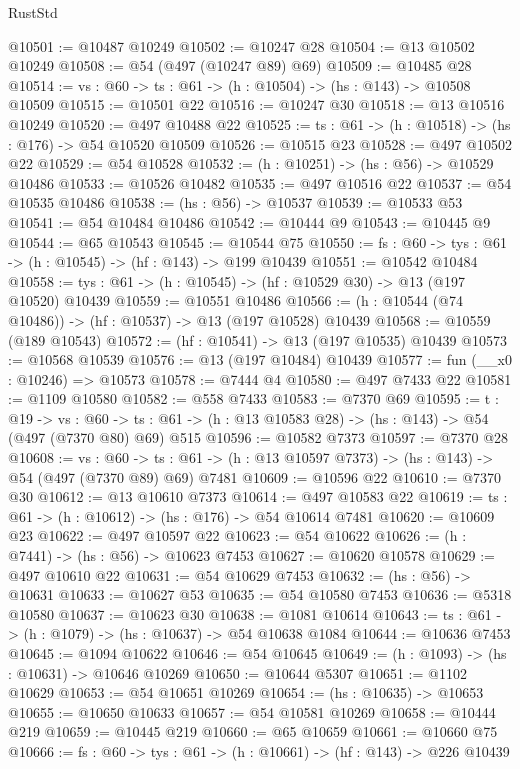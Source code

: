 \begin{lexlean}{RustStd}
\begin{coremodule}
@10501 := @10487 @10249
@10502 := @10247 @28
@10504 := @13 @10502 @10249
@10508 := @54 (@497 (@10247 @89) @69)
@10509 := @10485 @28
@10514 := {vs : @60} -> {ts : @61} -> (h : @10504) -> (hs : @143) -> @10508 @10509
@10515 := @10501 @22
@10516 := @10247 @30
@10518 := @13 @10516 @10249
@10520 := @497 @10488 @22
@10525 := {ts : @61} -> (h : @10518) -> (hs : @176) -> @54 @10520 @10509
@10526 := @10515 @23
@10528 := @497 @10502 @22
@10529 := @54 @10528
@10532 := (h : @10251) -> (hs : @56) -> @10529 @10486
@10533 := @10526 @10482
@10535 := @497 @10516 @22
@10537 := @54 @10535 @10486
@10538 := (hs : @56) -> @10537
@10539 := @10533 @53
@10541 := @54 @10484 @10486
@10542 := @10444 @9
@10543 := @10445 @9
@10544 := @65 @10543
@10545 := @10544 @75
@10550 := {fs : @60} -> {tys : @61} -> (h : @10545) -> (hf : @143) -> @199 @10439
@10551 := @10542 @10484
@10558 := {tys : @61} -> (h : @10545) -> (hf : @10529 @30) -> @13 (@197 @10520) @10439
@10559 := @10551 @10486
@10566 := (h : @10544 (@74 @10486)) -> (hf : @10537) -> @13 (@197 @10528) @10439
@10568 := @10559 (@189 @10543)
@10572 := (hf : @10541) -> @13 (@197 @10535) @10439
@10573 := @10568 @10539
@10576 := @13 (@197 @10484) @10439
@10577 := fun (__x0 : @10246) => @10573
@10578 := @7444 @4
@10580 := @497 @7433 @22
@10581 := @1109 @10580
@10582 := @558 @7433
@10583 := @7370 @69
@10595 := {t : @19} ->
  {vs : @60} -> {ts : @61} -> (h : @13 @10583 @28) -> (hs : @143) -> @54 (@497 (@7370 @80) @69) @515
@10596 := @10582 @7373
@10597 := @7370 @28
@10608 := {vs : @60} ->
  {ts : @61} -> (h : @13 @10597 @7373) -> (hs : @143) -> @54 (@497 (@7370 @89) @69) @7481
@10609 := @10596 @22
@10610 := @7370 @30
@10612 := @13 @10610 @7373
@10614 := @497 @10583 @22
@10619 := {ts : @61} -> (h : @10612) -> (hs : @176) -> @54 @10614 @7481
@10620 := @10609 @23
@10622 := @497 @10597 @22
@10623 := @54 @10622
@10626 := (h : @7441) -> (hs : @56) -> @10623 @7453
@10627 := @10620 @10578
@10629 := @497 @10610 @22
@10631 := @54 @10629 @7453
@10632 := (hs : @56) -> @10631
@10633 := @10627 @53
@10635 := @54 @10580 @7453
@10636 := @5318 @10580
@10637 := @10623 @30
@10638 := @1081 @10614
@10643 := {ts : @61} -> (h : @1079) -> (hs : @10637) -> @54 @10638 @1084
@10644 := @10636 @7453
@10645 := @1094 @10622
@10646 := @54 @10645
@10649 := (h : @1093) -> (hs : @10631) -> @10646 @10269
@10650 := @10644 @5307
@10651 := @1102 @10629
@10653 := @54 @10651 @10269
@10654 := (hs : @10635) -> @10653
@10655 := @10650 @10633
@10657 := @54 @10581 @10269
@10658 := @10444 @219
@10659 := @10445 @219
@10660 := @65 @10659
@10661 := @10660 @75
@10666 := {fs : @60} -> {tys : @61} -> (h : @10661) -> (hf : @143) -> @226 @10439

\end{coremodule}
\end{lexlean}
